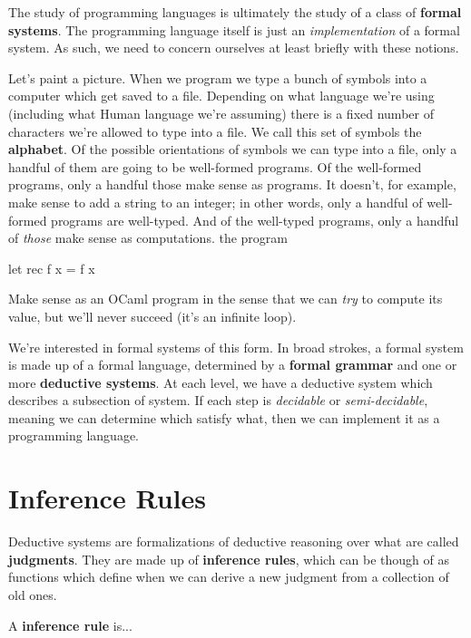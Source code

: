 The study of programming languages is ultimately the study of a class of \textbf{formal systems}.
The programming language itself is just an \textit{implementation} of a formal system.
As such, we need to concern ourselves at least briefly with these notions.

Let's paint a picture.
When we program we type a bunch of symbols into a computer which get saved to a file.
Depending on what language we're using (including what Human language we're assuming) there is a fixed number of characters we're allowed to type into a file.
We call this set of symbols the \textbf{alphabet}.
Of the possible orientations of symbols we can type into a file, only a handful of them are going to be well-formed programs.
Of the well-formed programs, only a handful those make sense as programs.
It doesn't, for example, make sense to add a string to an integer; in other words, only a handful of well-formed programs are well-typed.
And of the well-typed programs, only a handful of \textit{those} make sense as computations.
the program
\begin{ocaml}
  let rec f x = f x
\end{ocaml}
Make sense as an OCaml program in the sense that we can \textit{try} to compute its value, but we'll never succeed (it's an infinite loop).


We're interested in formal systems of this form.  In broad strokes, a formal system is made up of a formal language, determined by a \textbf{formal grammar} and one or more \textbf{deductive systems}.
At each level, we have a deductive system which describes a subsection of system.
If each step is \textit{decidable} or \textit{semi-decidable}, meaning we can determine which satisfy what, then we can implement it as a programming language.

\section{Inference Rules}

Deductive systems are formalizations of deductive reasoning over what are called \textbf{judgments}.
They are made up of \textbf{inference rules}, which can be though of as functions which define when we can derive a new judgment from a collection of old ones.

\begin{definition}
  A \textbf{inference rule} is...
\end{definition}

